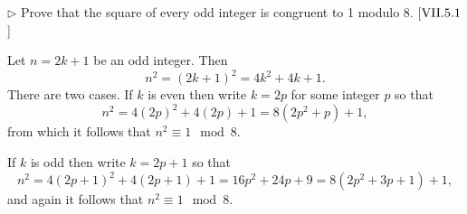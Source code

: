 \begin{exercise}
	$\triangleright$ Prove that the square of every odd integer is congruent to 1 modulo 8. [$\RNo{7}.5.1$]
\end{exercise}
\begin{solution}
	Let $n = 2k + 1$ be an odd integer. Then 
	\[
		n^2 = (2k+1)^2 = 4k^2 + 4k + 1.
	\]
	There are two cases. If $k$ is even then write $k = 2p$ for some integer $p$ so that 
	\[
		n^2 = 4(2p)^2 + 4(2p) + 1 = 8(2p^2 + p) + 1,
	\]
	from which it follows that $n^2 \equiv 1 \mod 8$.
	
	If $k$ is odd then write $k = 2p+1$ so that
	\[
		n^2 = 4(2p+1)^2 + 4(2p+1) + 1 = 16p^2 + 24p + 9 = 8(2p^2 + 3p + 1) + 1,
	\]
	and again it follows that $n^2 \equiv 1 \mod 8$.
\end{solution}

